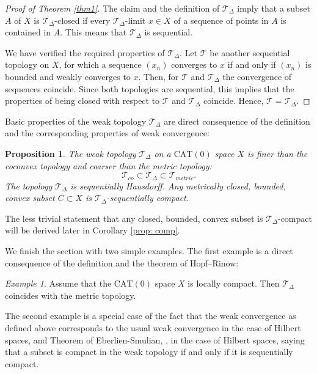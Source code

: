 \documentclass[12pt,leqno]{amsart}
\numberwithin{equation}{section}
\newtheorem{prop}[thm]{Proposition}
\theoremstyle{remark}
\newtheorem{ex}[thm]{Example}
\newcommand{\CAT}{\mathrm{CAT}}
\begin{document}
\begin{proof}[Proof of Theorem \ref{thm1}]
The claim and the definition of $\mathcal T_{\Delta}$ imply that a subset $A$ of $X$ is $\mathcal T_{\Delta}$-closed if every $\mathcal T_{\Delta}$-limit $x\in X$ of a sequence of points in $A$ is contained in $A$. This means that $\mathcal T_{\Delta}$ is sequential.

We have verified the required properties of $\mathcal T_{\Delta}$. Let $\mathcal T$
be another sequential topology on $X$, for which a sequence $(x_n)$ converges 
to $x$ if and only if $(x_n)$ is bounded and weakly converges to $x$. Then, for $\mathcal T$ and $\mathcal T_{\Delta}$ the convergence of sequences coincide. Since both topologies are sequential, this implies that the properties of being closed with respect to $\mathcal T$ and $\mathcal T_{\Delta}$ coincide. Hence, $\mathcal T=\mathcal T_{\Delta}$.
\end{proof}

Basic properties of the weak topology $\mathcal T_{\Delta}$ are direct consequence
of the definition and the corresponding properties of weak convergence:

\begin{prop} \label{prop: delta}
The weak topology $\mathcal T_{\Delta}$ on a $\CAT(0)$ space $X$ 
is finer than the coconvex topology and coarser than the metric topology:
$$\mathcal T_{co} \subset \mathcal T_{\Delta}\subset \mathcal T_{metric} .$$
The topology $\mathcal T_{\Delta}$ is sequentially Hausdorff. Any metrically closed, bounded, convex subset $C\subset X$ 
is $\mathcal T_{\Delta}$-sequentially compact.
\end{prop}

The less trivial statement that any closed, bounded, convex subset is $\mathcal T_{\Delta}$-compact will be derived later in Corollary \ref{prop: comp}. 

We finish the section with two simple examples. The first example is a direct consequence of the definition and the theorem of Hopf--Rinow:

\begin{ex}
Assume that the $\CAT(0)$ space $X$ is locally compact. Then $\mathcal T_{\Delta}$ coincides with the metric topology. 
\end{ex}

The second example is a special case of the fact that 
the weak convergence as defined above corresponds to the usual weak convergence in the case of Hilbert spaces, \cite{Bac} and Theorem of Eberlien-Smulian, \cite{Eberlein}, in the case of Hilbert spaces, saying that a subset is compact in the weak topology if and only if it is sequentially compact. 
\end{document}
